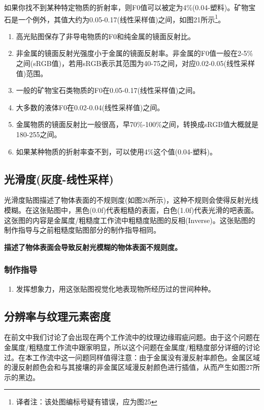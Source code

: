 如果你找不到某种特定物质的折射率，则F0值可以被定为4\%(0.04-塑料)。矿物宝石是一个例外，其值大约为0.05-0.17(线性采样值)之间，如图21所示\footnote{译者注：该处图编标号疑有错误，应为图25}。

\begin{enumerate}
\item 高光贴图保存了非导电物质的F0和纯金属的镜面反射比。
\item 非金属的镜面反射光强度小于金属的镜面反射率。非金属的F0值一般在2-5\%之间(sRGB值)，若用sRGB表示其范围为40-75之间，对应0.02-0.05(线性采样值)范围。
\item 一般的矿物宝石类物质的F0在0.05-0.17(线性采样值)之间。
\item 大多数的液体F0在0.02-0.04(线性采样值)之间。
\item 金属物质的镜面反射比一般很高，早70\%-100\%之间，转换成sRGB值大概就是180-255之间。
\item 如果某种物质的折射率查不到，可以使用4\%这个值(0.04-塑料)。
\end{enumerate}

\subsection{光滑度(灰度-线性采样)}

光滑度贴图描述了物体表面的不规则度(如图26所示)，这种不规则会使得反射光线模糊。在这张贴图中，黑色(0.0f)代表粗糙的表面，白色(1.0f)代表光滑的吧表面。这张图的内容是金属度/粗糙度工作流中粗糙度贴图的反相(Inverse)。这张贴图的制作指导与之前粗糙度贴图部分的制作指导相同。

\textbf{描述了物体表面会导致反射光模糊的物体表面不规则度。}

\subsubsection{制作指导}

\begin{enumerate}
\item 发挥想象力，用这张贴图视觉化地表现物所经历过的世间种种。
\end{enumerate}

\subsection{分辨率与纹理元素密度}

在前文中我们讨论了会出现在两个工作流中的纹理边缘瑕疵问题。由于这个问题在金属度/粗糙度工作流中跟家明显，所以这个问题在金属度/粗糙度部分详细的讨论过。在本工作流中这一问题同样值得注意：由于金属没有漫反射率颜色。金属区域的漫反射颜色会和与其接壤的非金属区域漫反射颜色进行插值，从而产生如图27所示的黑边。

